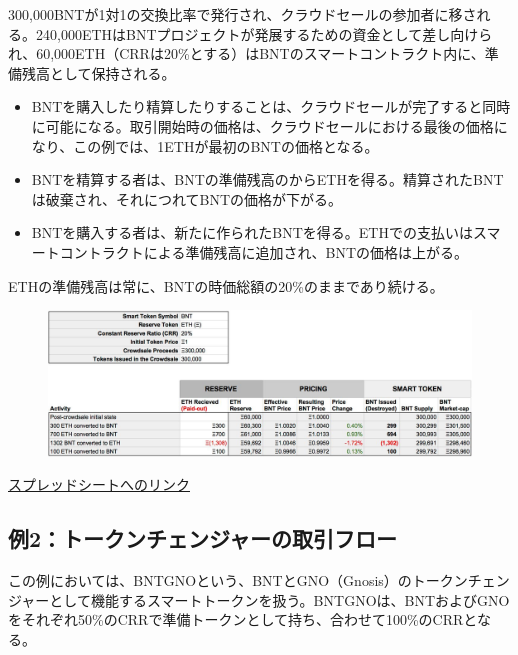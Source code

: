 \documentclass{jsarticle}
\begin{document}
   300,000BNTが1対1の交換比率で発行され、クラウドセールの参加者に移される。240,000ETHはBNTプロジェクトが発展するための資金として差し向けられ、60,000ETH（CRRは20\%とする）はBNTのスマートコントラクト内に、準備残高として保持される。

   \begin{itemize}
    \item BNTを購入したり精算したりすることは、クラウドセールが完了すると同時に可能になる。取引開始時の価格は、クラウドセールにおける最後の価格になり、この例では、1ETHが最初のBNTの価格となる。
    \item BNTを精算する者は、BNTの準備残高のからETHを得る。精算されたBNTは破棄され、それにつれてBNTの価格が下がる。
    \item BNTを購入する者は、新たに作られたBNTを得る。ETHでの支払いはスマートコントラクトによる準備残高に追加され、BNTの価格は上がる。
   \end{itemize}

   ETHの準備残高は常に、BNTの時価総額の20\%のままであり続ける。

   \begin{figure}[h]
    \begin{center}
     \includegraphics[scale=0.3]{fig2.png}
    \end{center}
   \end{figure}

   \href{https://goo.gl/3hR6e8}{スプレッドシートへのリンク}

  \subsection{例2：トークンチェンジャーの取引フロー}

  この例においては、BNTGNOという、BNTとGNO（Gnosis）のトークンチェンジャーとして機能するスマートトークンを扱う。BNTGNOは、BNTおよびGNOをそれぞれ50\%のCRRで準備トークンとして持ち、合わせて100\%のCRRとなる。
\end{document}
